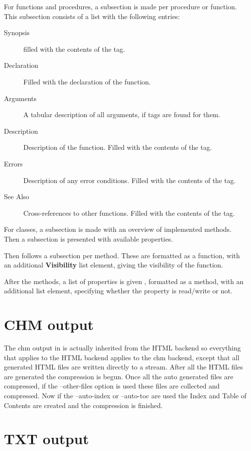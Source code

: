 For functions and procedures, a subsection is made per procedure or
function. This subsection consists of a list with the following entries:
\begin{description}
\item[Synopsis] filled with the contents of the  tag.
\item[Declaration] Filled with the declaration of the function.
\item[Arguments] A tabular description of all arguments, if  tags
are found for them.
\item[Description] Description of the function. Filled with the contents of
the  tag.
\item[Errors] Description of any error conditions. Filled with the contents
of the  tag.
\item[See Also] Cross-references to other functions. Filled with the
contents of the  tag.
\end{description}

For classes, a subsection is made with an overview of implemented methods.
Then a subsection is presented with available properties. 

Then follows a subsection per method. These are formatted as a function, with an
additional \textbf{Visibility} list element, giving the visibility of the
function.

After the methods, a list of properties is given , formatted as a method,
with an additional  list element, specifying whether the
property is read/write or not.

\section{CHM output}

The chm output in \fpdoc is actually inherited from the HTML backend so 
everything that applies to the HTML backend applies to the chm backend, except
that all generated HTML files are written directly to a stream. After all the
HTML files are generated the compression is begun. Once all the auto generated
files are compressed, if the --other-files option is used these files are 
collected and compressed. Now if the --auto-index or --auto-toc are used
the Index and Table of Contents are created and the compression is finished.

\section{TXT output}

